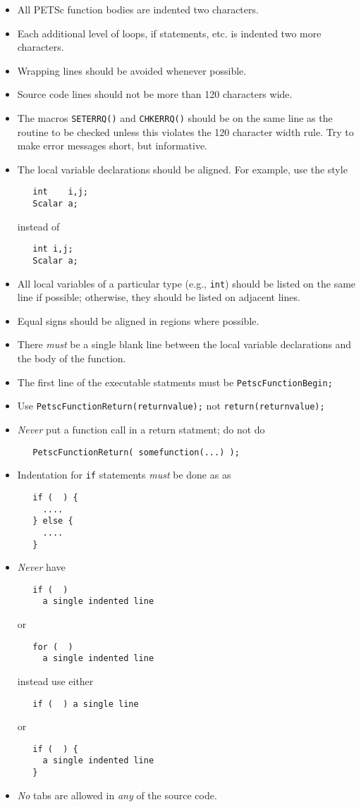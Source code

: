 \begin{itemize}
\item All PETSc function bodies are indented two characters.
\item Each additional level of loops, if statements, etc. is indented
      two more characters.
\item Wrapping lines should be avoided whenever possible.
\item Source code lines should not be more than 120 characters wide.
\item The macros {\tt SETERRQ()} and {\tt CHKERRQ()} should be on the 
      same line as the routine to be checked unless this violates the 
      120 character width rule. Try to make error messages short, but 
      informative.
\item The local variable declarations should be aligned. For example,
      use the style
\begin{verbatim}
   int    i,j;
   Scalar a;
\end{verbatim}
instead of
\begin{verbatim}
   int i,j;
   Scalar a;
\end{verbatim}
\item All local variables of a particular type (e.g., {\tt int}) should be 
      listed on the same line if possible; otherwise, they should be listed
      on adjacent lines.
\item Equal signs should be aligned in regions where possible.
\item There {\em must} be a single blank line
      between the local variable declarations and the body of the function.
\item The first line of the executable statments must be {\tt PetscFunctionBegin;}
\item Use {\tt PetscFunctionReturn(returnvalue);} not {\tt return(returnvalue);}
\item {\em Never} put a function call in a return statment; do not do
\begin{verbatim}
   PetscFunctionReturn( somefunction(...) );
\end{verbatim}
\item Indentation for {\tt if} statements {\em must}  be done  as
as
\begin{verbatim}
   if (  ) {
     ....
   } else {
     ....
   }
\end{verbatim}
\item {\em Never}  have 
\begin{verbatim}
   if (  ) 
     a single indented line
\end{verbatim}
or
\begin{verbatim}
   for (  )
     a single indented line
\end{verbatim}
instead use either 
\begin{verbatim}
   if (  ) a single line
\end{verbatim}
or 
\begin{verbatim}
   if (  ) {
     a single indented line
   }
\end{verbatim}
\item {\em No} tabs are allowed in {\em any} of the source code.
\end{itemize}

